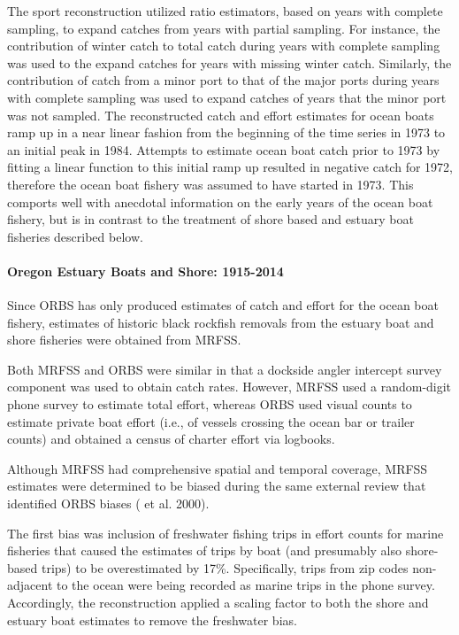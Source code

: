 \documentclass[11pt,
  english,
  letterpaper,
]{article}
\begin{document}
The sport reconstruction utilized ratio estimators, based on years with complete sampling, to expand catches from years with partial sampling. For instance, the contribution of winter catch to total catch during years with complete sampling was used to the expand catches for years with missing winter catch. Similarly, the contribution of catch from a minor port to that of the major ports during years with complete sampling was used to expand catches of years that the minor port was not sampled. The reconstructed catch and effort estimates for ocean boats ramp up in a near linear fashion from the beginning of the time series in 1973 to an initial peak in 1984. Attempts to estimate ocean boat catch prior to 1973 by fitting a linear function to this initial ramp up resulted in negative catch for 1972, therefore the ocean boat fishery was assumed to have started in 1973. This comports well with anecdotal information on the early years of the ocean boat fishery, but is in contrast to the treatment of shore based and estuary boat fisheries described below.

\hypertarget{oregon-estuary-boats-and-shore-1915-2014}{%
\paragraph{Oregon Estuary Boats and Shore: 1915-2014}\label{oregon-estuary-boats-and-shore-1915-2014}}

Since ORBS has only produced estimates of catch and effort for the ocean boat fishery, estimates of historic black rockfish removals from the estuary boat and shore fisheries were obtained from MRFSS.

Both MRFSS and ORBS were similar in that a dockside angler intercept survey component was used to obtain catch rates. However, MRFSS used a random-digit phone survey to estimate total effort, whereas ORBS used visual counts to estimate private boat effort (i.e., of vessels crossing the ocean bar or trailer counts) and obtained a census of charter effort via logbooks.

Although MRFSS had comprehensive spatial and temporal coverage, MRFSS estimates were determined to be biased during the same external review that identified ORBS biases ( et al. 2000).

The first bias was inclusion of freshwater fishing trips in effort counts for marine fisheries that caused the estimates of trips by boat (and presumably also shore-based trips) to be overestimated by 17\%. Specifically, trips from zip codes non-adjacent to the ocean were being recorded as marine trips in the phone survey. Accordingly, the reconstruction applied a scaling factor to both the shore and estuary boat estimates to remove the freshwater bias.
\end{document}
